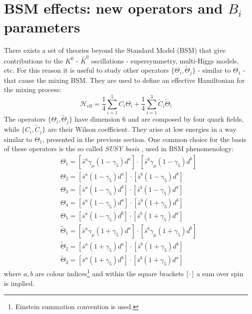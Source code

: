 \documentclass[english, LaM, oneside, noexaminfo]{sapthesis}
\newcommand{\kkb}{$K^0$ - $\bar K^0$ }
\begin{document}
\section{BSM effects: new operators and $B_i$ parameters}
\noindent
There exists a set of theories beyond the Standard Model (BSM) that give contributions to the \kkb oscillations - supersymmetry, multi-Higgs models, etc.
For this reason it is useful to study other operators $\{\Theta_i,\tilde\Theta_j\}$ - similar to $\Theta_1$ - that cause the mixing BSM.
They are used to define an effective Hamiltonian for the mixing process:
\begin{equation*}
    \mathcal{H}_\text{eff} = \frac{1}{4} \sum_{i = 1}^5 C_i \Theta_i + \frac{1}{4} \sum_{i = 1}^3 \tilde C_i \tilde \Theta_i
\end{equation*}
The operators $\{\Theta_i,\tilde\Theta_j\}$ have dimension 6 and are composed by four quark fields, while $\{C_i,\tilde C_j\}$ are their Wilson coefficient.
They arise at low energies in a way similar to $\Theta_1$, presented in the previous section.
One common choice for the basis of these operators is the so called \textit{SUSY basis} \cite{Bparameters}, used in BSM phenomenology:
\begin{equation}\label{eq:Thetai-operators}
    \begin{aligned}
       & \Theta_1 = [\bar s^a \gamma_\mu (1-\gamma_5) d^a] \cdot [ \bar s^b \gamma_\mu (1-\gamma_5) d^b ] \\
       & \Theta_2 = [\bar s^a  (1-\gamma_5) d^a ] \cdot [ \bar s^b (1-\gamma_5) d^b ] \\
       & \Theta_3 = [\bar s^a  (1-\gamma_5) d^b ] \cdot [ \bar s^b (1-\gamma_5) d^a ] \\
       & \Theta_4 = [\bar s^a  (1-\gamma_5) d^a ] \cdot [ \bar s^b (1+\gamma_5) d^b ] \\
       & \Theta_5 = [\bar s^a  (1-\gamma_5) d^b ] \cdot [ \bar s^b (1+\gamma_5) d^a ] \\
       & \tilde\Theta_1 = [\bar s^a \gamma_\mu (1+\gamma_5) d^a] \cdot [ \bar s^b \gamma_\mu (1+\gamma_5) d^b ] \\
       & \tilde\Theta_2 = [\bar s^a  (1+\gamma_5) d^a] \cdot [ \bar s^b (1+\gamma_5) d^b ] \\
       & \tilde\Theta_3 = [\bar s^a  (1+\gamma_5) d^b] \cdot [ \bar s^b (1+\gamma_5) d^a ]
    \end{aligned}
\end{equation}
where $a,b$ are colour indices\footnote{Einstein summation convention is used.} and within the square brackets $[\hspace*{0.5mm}\cdot\hspace*{0.5mm}]$ a sum over spin is implied.
\end{document}
